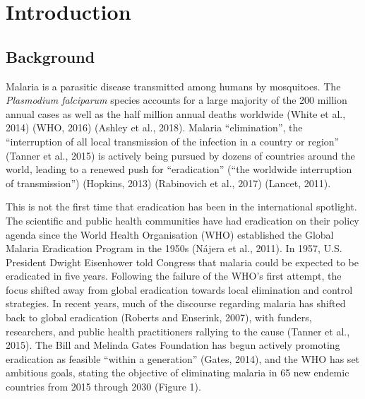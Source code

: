 \documentclass[]{article}
\begin{document}
\newpage

\section{Introduction}\label{introduction}

\subsection{Background}\label{background}

Malaria is a parasitic disease transmitted among humans by mosquitoes.
The \emph{Plasmodium falciparum} species accounts for a large majority
of the 200 million annual cases as well as the half million annual
deaths worldwide (White et al., 2014) (WHO, 2016) (Ashley et al., 2018).
Malaria ``elimination'', the ``interruption of all local transmission of
the infection in a country or region'' (Tanner et al., 2015) is actively
being pursued by dozens of countries around the world, leading to a
renewed push for ``eradication'' (``the worldwide interruption of
transmission'') (Hopkins, 2013) (Rabinovich et al., 2017) (Lancet,
2011).

This is not the first time that eradication has been in the
international spotlight. The scientific and public health communities
have had eradication on their policy agenda since the World Health
Organisation (WHO) established the Global Malaria Eradication Program in
the 1950s (Nájera et al., 2011). In 1957, U.S. President Dwight
Eisenhower told Congress that malaria could be expected to be eradicated
in five years. Following the failure of the WHO's first attempt, the
focus shifted away from global eradication towards local elimination and
control strategies. In recent years, much of the discourse regarding
malaria has shifted back to global eradication (Roberts and Enserink,
2007), with funders, researchers, and public health practitioners
rallying to the cause (Tanner et al., 2015). The Bill and Melinda Gates
Foundation has begun actively promoting eradication as feasible ``within
a generation'' (Gates, 2014), and the WHO has set ambitious goals,
stating the objective of eliminating malaria in 65 new endemic countries
from 2015 through 2030 (Figure 1).
\end{document}
